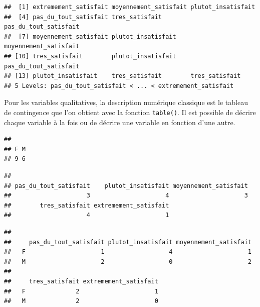 \documentclass[
]{book}
\newenvironment{Shaded}{\begin{snugshade}}{\end{snugshade}}
\newcommand{\FunctionTok}[1]{\textcolor[rgb]{0.13,0.29,0.53}{\textbf{#1}}}
\newcommand{\NormalTok}[1]{#1}
\newcommand{\SpecialCharTok}[1]{\textcolor[rgb]{0.81,0.36,0.00}{\textbf{#1}}}
\begin{document}
\begin{verbatim}
##  [1] extremement_satisfait moyennement_satisfait plutot_insatisfait   
##  [4] pas_du_tout_satisfait tres_satisfait        pas_du_tout_satisfait
##  [7] moyennement_satisfait plutot_insatisfait    moyennement_satisfait
## [10] tres_satisfait        plutot_insatisfait    pas_du_tout_satisfait
## [13] plutot_insatisfait    tres_satisfait        tres_satisfait       
## 5 Levels: pas_du_tout_satisfait < ... < extremement_satisfait
\end{verbatim}

Pour les variables qualitatives, la description numérique classique est le tableau de contingence que l'on obtient avec la fonction \texttt{table()}. Il est possible de décrire chaque variable à la fois ou de décrire une variable en fonction d'une autre.

\begin{Shaded}
\end{Shaded}

\begin{verbatim}
## 
## F M 
## 9 6
\end{verbatim}

\begin{Shaded}
\end{Shaded}

\begin{verbatim}
## 
## pas_du_tout_satisfait    plutot_insatisfait moyennement_satisfait 
##                     3                     4                     3 
##        tres_satisfait extremement_satisfait 
##                     4                     1
\end{verbatim}

\begin{Shaded}
\end{Shaded}

\begin{verbatim}
##    
##     pas_du_tout_satisfait plutot_insatisfait moyennement_satisfait
##   F                     1                  4                     1
##   M                     2                  0                     2
##    
##     tres_satisfait extremement_satisfait
##   F              2                     1
##   M              2                     0
\end{verbatim}
\end{document}
